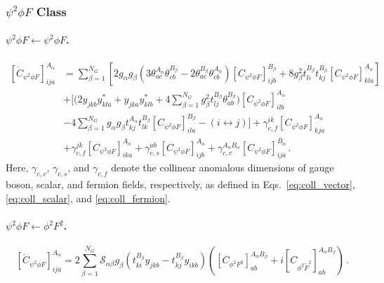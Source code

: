 \subsubsection{\texorpdfstring{$\psi^2 \phi F$}{psi2phiF} Class}

\paragraph{$\psi^2 \phi F \leftarrow \psi^2 \phi F$.}

\begin{align}
    \left[\dot C_{\psi^2 \phi F}\right]_{ija}^{A_\alpha} &=  \sum_{\beta=1}^{N_G}\left[ 2 g_\alpha g_\beta \left(3\theta^{A_\alpha}_{ac}\theta^{B_\beta}_{cb}-2\theta^{B_\beta}_{ac}\theta^{A_\alpha}_{cb}\right)\left[ C_{\psi^2 \phi F}\right]_{ijb}^{B_\beta}+ 8 g_\beta^2 t^{B_\beta}_{li}t^{B_\beta}_{kj} \left[ C_{\psi^2 \phi F}\right]_{kla}^{A_\alpha}\right]\nonumber \\
    &+ \Bigg[\Bigg(2y_{jkb}y^*_{kla}+y_{jka}y^*_{klb}+4\sum_{\beta=1}^{N_G}g_\beta^2 t^{B_\beta}_{lj}\theta^{B_\beta}_{ab} \Bigg)\left[C_{\psi^2\phi F}\right]_{ilb}^{A_\alpha}\nonumber \\
    &- 
    4\sum_{\beta=1}^{N_G}g_\alpha g_\beta t^{A_\alpha}_{kj}t^{B_\beta}_{lk}\left[C_{\psi^2\phi F}\right]^{B_\beta}_{ila}
    -\left(i \leftrightarrow j\right)\Bigg] + \gamma_{c,f}^{ik}\left[C_{\psi^2\phi F}\right]^{A_\alpha}_{kja} \nonumber \\&+ \gamma_{c,f}^{jk}\left[C_{\psi^2\phi F}\right]^{A_\alpha}_{ika} + \gamma_{c,s}^{ab}\left[C_{\psi^2\phi F}\right]^{A_\alpha}_{ijb}
    + \gamma_{c,v}^{A_\alpha B_\alpha}\left[C_{\psi^2\phi F}\right]^{B_\alpha}_{ija}
    \,.\label{psi2phiF_psi2phiF}
\end{align}
Here, $\gamma_{c,v}$, $\gamma_{c,s}$, and $\gamma_{c,f}$ denote the collinear anomalous dimensions of gauge boson, scalar, and fermion fields, respectively, as defined in Eqs.~\eqref{eq:coll_vector}, \eqref{eq:coll_scalar}, and \eqref{eq:coll_fermion}.

\paragraph{$\psi^2 \phi F \leftarrow \phi^2 F^2$.}

\begin{equation}
    \left[\dot C_{\psi^2 \phi F}\right]_{ija}^{A_\alpha} =
    2 \sum_{\beta=1}^{N_G} \mathcal S_{\alpha\beta} g_\beta \left(t^{B_\beta}_{ki} y_{jkb}-t^{B_\beta}_{kj} y_{ikb}  \right) \left(
    \left[C_{\phi^2 F^2}\right]_{ab}^{A_\alpha B_\beta} + i \left[C_{\phi^2 \widetilde F^2}\right]_{ab}^{A_\alpha B_\beta}
    \right)\,.\label{psi2phiF_phi2F2}
\end{equation}

